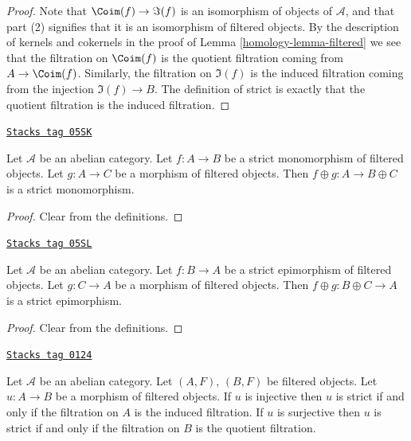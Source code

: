 \begin{proof}

Note that $\Coim(f) \to \Im(f)$ is an isomorphism of
objects of $\mathcal{A}$, and that part (2) signifies that it is
an isomorphism of filtered objects.
By the description of kernels and cokernels in the proof of
Lemma \ref{homology-lemma-filtered}
we see that the filtration on $\Coim(f)$ is the
quotient filtration coming from $A \to \Coim(f)$.
Similarly, the filtration on $\Im(f)$ is the induced
filtration coming from the injection $\Im(f) \to B$.
The definition of strict is exactly that the quotient filtration
is the induced filtration.
\end{proof}

\begin{lemma}
\label{homology-lemma-add-summand-strict-monomorphism}
\href{https://stacks.math.columbia.edu/tag/05SK}{\texttt{Stacks tag 05SK}}

Let $\mathcal{A}$ be an abelian category.
Let $f : A \to B$ be a strict monomorphism of filtered objects.
Let $g : A \to C$ be a morphism of filtered objects.
Then $f \oplus g : A \to B \oplus C$ is a strict monomorphism.
\end{lemma}

\begin{proof}
Clear from the definitions.
\end{proof}

\begin{lemma}
\label{homology-lemma-add-summand-strict-epimorphism}
\href{https://stacks.math.columbia.edu/tag/05SL}{\texttt{Stacks tag 05SL}}

Let $\mathcal{A}$ be an abelian category.
Let $f : B \to A$ be a strict epimorphism of filtered objects.
Let $g : C \to A$ be a morphism of filtered objects.
Then $f \oplus g : B \oplus C \to A$ is a strict epimorphism.
\end{lemma}

\begin{proof}
Clear from the definitions.
\end{proof}

\begin{lemma}
\label{homology-lemma-induced-and-quotient-strict}
\href{https://stacks.math.columbia.edu/tag/0124}{\texttt{Stacks tag 0124}}

Let $\mathcal{A}$ be an abelian category.
Let $(A, F)$, $(B, F)$ be filtered objects.
Let $u : A \to B$ be a morphism of filtered objects.
If $u$ is injective then $u$ is strict if and only if the filtration
on $A$ is the induced filtration.
If $u$ is surjective then $u$ is strict if and only if the filtration
on $B$ is the quotient filtration.
\end{lemma}

